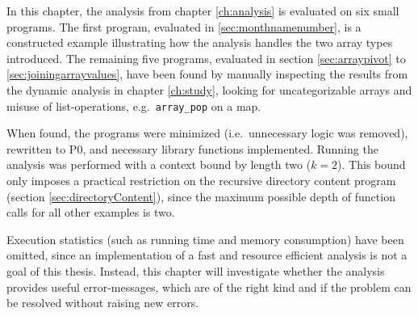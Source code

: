 In this chapter, the analysis from chapter \ref{ch:analysis} is evaluated on six small programs. The first program, evaluated in \ref{sec:monthnamenumber}, is a constructed example illustrating how the analysis handles the two array types introduced. The remaining five programs, evaluated in section \ref{sec:arraypivot} to \ref{sec:joiningarrayvalues}, have been found by manually inspecting the results from the dynamic analysis in chapter \ref{ch:study}, looking for uncategorizable arrays and misuse of list-operations, e.g.\ \texttt{array\_pop} on a map. 


When found, the programs were minimized (i.e.\ unnecessary logic was removed), rewritten to P0, and necessary library functions implemented. Running the analysis was performed with a context bound by length two ($k=2$). This bound only imposes a practical restriction on the recursive directory content program (section \ref{sec:directoryContent}), since the maximum possible depth of function calls for all other examples is two. 

Execution statistics (such as running time and memory consumption) have been omitted, since an implementation of a fast and resource efficient analysis is not a goal of this thesis. Instead, this chapter will investigate whether the analysis provides useful error-messages, which are of the right kind and if the problem can be resolved without raising new errors.



